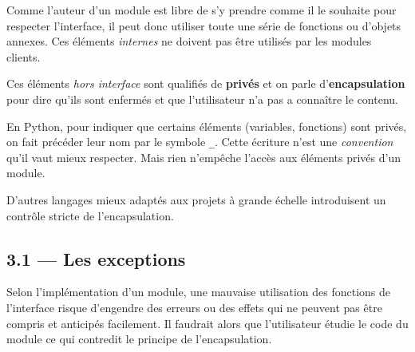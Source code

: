 \documentclass[a4paper,17pt]{extarticle}
\begin{document}
    Comme l'auteur d'un module est libre de s'y prendre comme il le souhaite
pour respecter l'interface, il peut donc utiliser toute une série de
fonctions ou d'objets annexes. Ces éléments \emph{internes} ne doivent
pas être utilisés par les modules clients.
\begin{retenir}
    Ces éléments \emph{hors interface} sont qualifiés de \textbf{privés} et
on parle d'\textbf{encapsulation} pour dire qu'ils sont enfermés et que
l'utilisateur n'a pas a connaître le contenu.

        \end{retenir}\begin{exemple}
    En Python, pour indiquer que certains éléments (variables, fonctions)
sont privés, on fait précéder leur nom par le symbole \texttt{\_}. Cette
écriture n'est une \emph{convention} qu'il vaut mieux respecter. Mais
rien n'empêche l'accès aux éléments privés d'un module.

D'autres langages mieux adaptés aux projets à grande échelle
introduisent un contrôle stricte de l'encapsulation.

        \end{exemple}
    \hypertarget{les-exceptions}{%
\subsection{3.1 --- Les exceptions}\label{les-exceptions}}

    Selon l'implémentation d'un module, une mauvaise utilisation des
fonctions de l'interface risque d'engendre des erreurs ou des effets qui
ne peuvent pas être compris et anticipés facilement. Il faudrait alors
que l'utilisateur étudie le code du module ce qui contredit le principe
de l'encapsulation.
\end{document}
